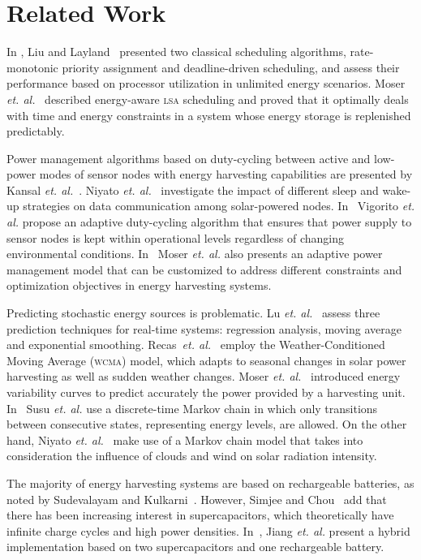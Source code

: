 \section{Related Work} \label{sec:related work}
In , Liu and Layland~\cite{Liu73} presented two classical scheduling algorithms, rate-monotonic priority assignment and deadline-driven scheduling, 
and assess their performance based on processor utilization in unlimited energy scenarios. Moser \emph{et. al.}~\cite{moser2007real} described energy-aware \textsc{lsa} scheduling
and proved that it optimally deals with time and energy constraints in a system whose energy storage is replenished predictably. 

Power management algorithms based on duty-cycling between active and low-power modes of sensor nodes with energy harvesting capabilities are 
presented by Kansal \emph{et. al.}~\cite{kansal2007power}. Niyato \emph{et. al.}~\cite{niyato2007sleep} investigate the impact of different sleep and wake-up strategies on data communication
among solar-powered nodes. In~\cite{vigorito2007adaptive} Vigorito \emph{et. al.} propose an adaptive duty-cycling algorithm that ensures that power supply to sensor
nodes is kept within operational levels regardless of changing environmental conditions. In~\cite{moser2007adaptive} Moser \emph{et. al.} also presents an adaptive power management
model that can be customized to address different constraints and optimization objectives in energy harvesting systems.

Predicting stochastic energy sources is problematic.  Lu \emph{et. al.}~\cite{lu2010accurate} assess three prediction techniques for real-time systems: regression analysis,
moving average and exponential smoothing. Recas~\emph{et. al.}~\cite{recas2000hollows} employ the Weather-Conditioned Moving Average (\textsc{wcma}) model, which adapts to seasonal changes in
solar power harvesting as well as sudden weather changes. Moser \emph{et. al.}~\cite{moser2007real} introduced energy variability curves to predict accurately
the power provided by a harvesting unit. In~\cite{susu2008stochastic} Susu \emph{et. al.} use a discrete-time Markov chain in which only transitions between 
consecutive states, representing energy levels, are allowed. On the other hand, Niyato \emph{et. al.}~\cite{niyato2007sleep} make use of a Markov chain model 
that takes into consideration the influence of clouds and wind on solar radiation intensity. 

The majority of energy harvesting systems are based on rechargeable batteries, as noted by Sudevalayam and Kulkarni~\cite{sudevalyam2010energy}.
However, Simjee and Chou~\cite{simjee2007everlast} add that there has been increasing interest in supercapacitors, which theoretically have infinite charge cycles and high power densities. In~\cite{jiang2005perpetual}, Jiang \emph{et. al.} present a hybrid implementation based on two supercapacitors and one rechargeable battery.